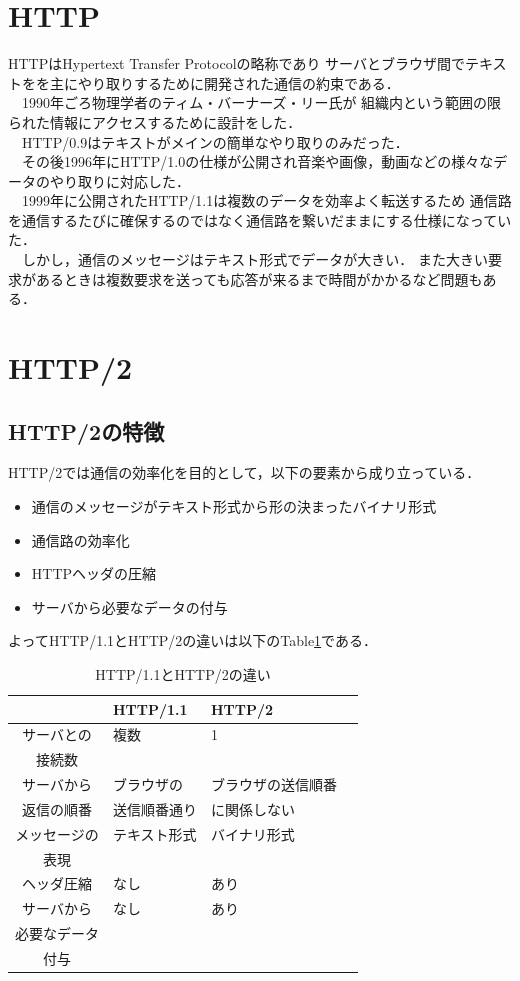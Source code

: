 \documentclass[a4j,9pt,twocolumn]{jsarticle}
\begin{document}
\section{HTTP}
HTTPはHypertext Transfer Protocolの略称であり
サーバとブラウザ間でテキストをを主にやり取りするために開発された通信の約束である．
\\　1990年ごろ物理学者のティム・バーナーズ・リー氏が
組織内という範囲の限られた情報にアクセスするために設計をした．
\\　HTTP/0.9はテキストがメインの簡単なやり取りのみだった．
\\　その後1996年にHTTP/1.0の仕様が公開され音楽や画像，動画などの様々なデータのやり取りに対応した．
\\　1999年に公開されたHTTP/1.1は複数のデータを効率よく転送するため
通信路を通信するたびに確保するのではなく通信路を繋いだままにする仕様になっていた．
\\　しかし，通信のメッセージはテキスト形式でデータが大きい．
また大きい要求があるときは複数要求を送っても応答が来るまで時間がかかるなど問題もある．


\section{HTTP/2}
\subsection{HTTP/2の特徴}
HTTP/2では通信の効率化を目的として，以下の要素から成り立っている．

\begin{itemize}
 \item  通信のメッセージがテキスト形式から形の決まったバイナリ形式
 \item 通信路の効率化
 \item HTTPヘッダの圧縮
 \item サーバから必要なデータの付与
\end{itemize}

よってHTTP/1.1とHTTP/2の違いは以下のTable\ref{table00}である．

\begin{table}[h]
\begin{tabular}{|c|l|l|l|}
\hline
　 & HTTP/1.1 & HTTP/2  \\ \hline
サーバとの &  複数& 1\\
接続数&&\\ \hline
サーバから & ブラウザの & ブラウザの送信順番\\
返信の順番&送信順番通り&に関係しない \\ \hline
メッセージの & テキスト形式 & バイナリ形式\\
表現&&\\ \hline
ヘッダ圧縮 & なし & あり  \\ \hline
サーバから & なし & あり  \\
必要なデータ&&\\
付与&&\\ \hline


\end{tabular}
\caption{HTTP/1.1とHTTP/2の違い}
\label{table00}
\end{table}
\end{document}
